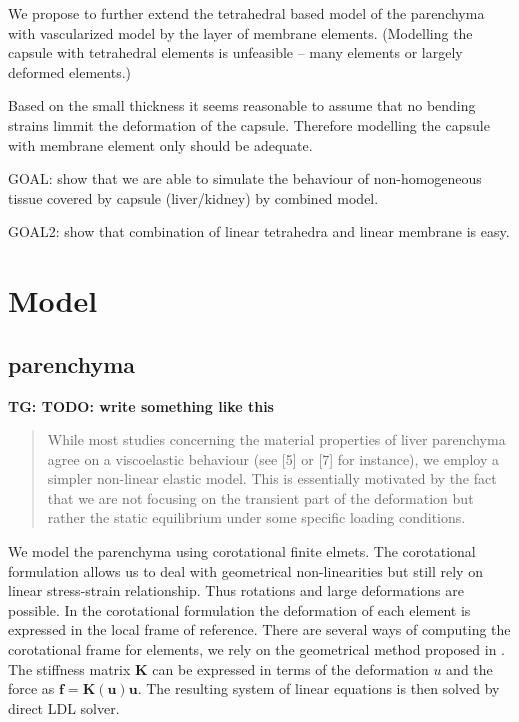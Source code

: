\documentclass{llncs}
\newcommand{\TG}[1]{{\color{blue}\textbf{TG: #1}}}
\newcommand{\Vec}[1]{\mathbf{#1}}
\newcommand{\Mat}[1]{\mathbf{#1}}
\begin{document}

We propose to further extend the tetrahedral based model of the parenchyma
with vascularized model \cite{Peterlik2012} by the layer of membrane elements.
(Modelling the capsule with tetrahedral elements is unfeasible -- many
elements or largely deformed elements.)

Based on the small thickness it seems reasonable to assume that no bending
strains limmit the deformation of the capsule. Therefore modelling the
capsule with membrane element only should be adequate.

GOAL: show that we are able to simulate the behaviour of non-homogeneous
tissue covered by capsule (liver/kidney) by combined model.

GOAL2: show that combination of linear tetrahedra and linear membrane is
easy.



\section{Model}

\subsection{parenchyma} %



\TG{TODO: write something like this} %
\begin{quote}
While most studies concerning the material properties of liver parenchyma
agree on a viscoelastic behaviour (see [5] or [7] for instance), we employ
a simpler non-linear elastic model. This is essentially motivated by the
fact that we are not focusing on the transient part of the deformation but
rather the static equilibrium under some specific loading conditions.
\end{quote}


We model the parenchyma using corotational finite elmets. The corotational
formulation allows us to deal with geometrical non-linearities but still
rely on linear stress-strain relationship. Thus rotations and large
deformations are possible. In the corotational formulation the deformation
of each element is expressed in the local frame of reference. There are
several ways of computing the corotational frame for elements, we rely on
the geometrical method proposed in \cite{Nesme2005}.
The stiffness matrix $\Mat{K}$ can be expressed in terms of the deformation
$u$ and the force as $\Vec{f} = \Mat{K}(\Vec{u}) \Vec{u}$. The resulting
system of linear equations is then solved by direct LDL solver.
\end{document}
